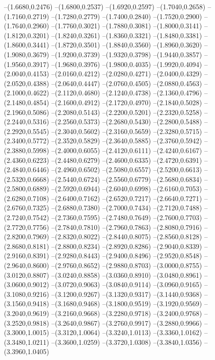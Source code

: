 {\begin{scope}
--(1.6680,0.2476)
--(1.6800,0.2537)
--(1.6920,0.2597)
--(1.7040,0.2658)
--(1.7160,0.2719)
--(1.7280,0.2779)
--(1.7400,0.2840)
--(1.7520,0.2900)
--(1.7640,0.2960)
--(1.7760,0.3021)
--(1.7880,0.3081)
--(1.8000,0.3141)
--(1.8120,0.3201)
--(1.8240,0.3261)
--(1.8360,0.3321)
--(1.8480,0.3381)
--(1.8600,0.3441)
--(1.8720,0.3501)
--(1.8840,0.3560)
--(1.8960,0.3620)
--(1.9080,0.3679)
--(1.9200,0.3739)
--(1.9320,0.3798)
--(1.9440,0.3857)
--(1.9560,0.3917)
--(1.9680,0.3976)
--(1.9800,0.4035)
--(1.9920,0.4094)
--(2.0040,0.4153)
--(2.0160,0.4212)
--(2.0280,0.4271)
--(2.0400,0.4329)
--(2.0520,0.4388)
--(2.0640,0.4447)
--(2.0760,0.4505)
--(2.0880,0.4563)
--(2.1000,0.4622)
--(2.1120,0.4680)
--(2.1240,0.4738)
--(2.1360,0.4796)
--(2.1480,0.4854)
--(2.1600,0.4912)
--(2.1720,0.4970)
--(2.1840,0.5028)
--(2.1960,0.5086)
--(2.2080,0.5143)
--(2.2200,0.5201)
--(2.2320,0.5258)
--(2.2440,0.5316)
--(2.2560,0.5373)
--(2.2680,0.5430)
--(2.2800,0.5488)
--(2.2920,0.5545)
--(2.3040,0.5602)
--(2.3160,0.5659)
--(2.3280,0.5715)
--(2.3400,0.5772)
--(2.3520,0.5829)
--(2.3640,0.5885)
--(2.3760,0.5942)
--(2.3880,0.5998)
--(2.4000,0.6055)
--(2.4120,0.6111)
--(2.4240,0.6167)
--(2.4360,0.6223)
--(2.4480,0.6279)
--(2.4600,0.6335)
--(2.4720,0.6391)
--(2.4840,0.6446)
--(2.4960,0.6502)
--(2.5080,0.6557)
--(2.5200,0.6613)
--(2.5320,0.6668)
--(2.5440,0.6724)
--(2.5560,0.6779)
--(2.5680,0.6834)
--(2.5800,0.6889)
--(2.5920,0.6944)
--(2.6040,0.6998)
--(2.6160,0.7053)
--(2.6280,0.7108)
--(2.6400,0.7162)
--(2.6520,0.7217)
--(2.6640,0.7271)
--(2.6760,0.7325)
--(2.6880,0.7380)
--(2.7000,0.7434)
--(2.7120,0.7488)
--(2.7240,0.7542)
--(2.7360,0.7595)
--(2.7480,0.7649)
--(2.7600,0.7703)
--(2.7720,0.7756)
--(2.7840,0.7810)
--(2.7960,0.7863)
--(2.8080,0.7916)
--(2.8200,0.7969)
--(2.8320,0.8022)
--(2.8440,0.8075)
--(2.8560,0.8128)
--(2.8680,0.8181)
--(2.8800,0.8234)
--(2.8920,0.8286)
--(2.9040,0.8339)
--(2.9160,0.8391)
--(2.9280,0.8443)
--(2.9400,0.8496)
--(2.9520,0.8548)
--(2.9640,0.8600)
--(2.9760,0.8652)
--(2.9880,0.8703)
--(3.0000,0.8755)
--(3.0120,0.8807)
--(3.0240,0.8858)
--(3.0360,0.8910)
--(3.0480,0.8961)
--(3.0600,0.9012)
--(3.0720,0.9063)
--(3.0840,0.9114)
--(3.0960,0.9165)
--(3.1080,0.9216)
--(3.1200,0.9267)
--(3.1320,0.9317)
--(3.1440,0.9368)
--(3.1560,0.9418)
--(3.1680,0.9468)
--(3.1800,0.9519)
--(3.1920,0.9569)
--(3.2040,0.9619)
--(3.2160,0.9668)
--(3.2280,0.9718)
--(3.2400,0.9768)
--(3.2520,0.9818)
--(3.2640,0.9867)
--(3.2760,0.9917)
--(3.2880,0.9966)
--(3.3000,1.0015)
--(3.3120,1.0064)
--(3.3240,1.0113)
--(3.3360,1.0162)
--(3.3480,1.0211)
--(3.3600,1.0259)
--(3.3720,1.0308)
--(3.3840,1.0356)
--(3.3960,1.0405)

\end{scope}}
